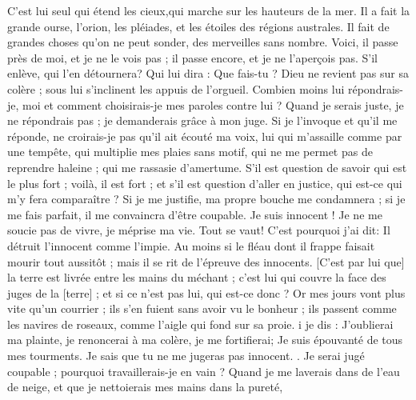 \begin{multicols}{2}
 C'est lui seul qui étend les cieux,qui marche sur les hauteurs de la mer.
Il a fait la grande ourse, l'orion, les pléiades, et les étoiles des régions australes.
Il fait de grandes choses qu'on ne peut sonder, des merveilles sans nombre.
Voici, il passe près de moi, et je ne le vois pas ; il passe encore, et je ne l'aperçois pas.
S'il enlève, qui l'en détournera? Qui lui dira : Que fais-tu ?
Dieu ne revient pas sur sa colère ; sous lui s'inclinent les appuis de l'orgueil.
Combien moins lui répondrais-je, moi et comment choisirais-je mes paroles contre lui ? 
Quand je serais juste, je ne répondrais pas ; je demanderais grâce à mon juge.
Si je l'invoque et qu'il me réponde, ne croirais-je pas qu'il ait écouté ma voix,
lui qui m'assaille comme par une tempête, qui multiplie mes plaies sans motif,
qui ne me permet pas de reprendre haleine ; qui me rassasie d'amertume.
S'il est question de savoir qui est le plus fort ; voilà, il est fort ; et s'il est question d'aller en justice, qui est-ce qui m'y fera comparaître ? 
Si je me justifie, ma propre bouche me condamnera ; si je me fais parfait, il me convaincra d'être coupable.
Je suis innocent ! Je ne me soucie pas de vivre, je méprise ma vie.
Tout se vaut! C'est pourquoi j'ai dit: Il détruit l'innocent comme l'impie. 
Au moins si le fléau dont il frappe faisait mourir tout aussitôt ; mais il se rit de l'épreuve des innocents. 
[C'est par lui que] la terre est livrée entre les mains du méchant ; c'est lui qui couvre la face des juges de la [terre] ; et si ce n'est pas lui, qui est-ce donc ? 
Or mes jours vont plus vite qu'un courrier ; ils s'en fuient sans avoir vu le bonheur ;
ils passent comme les navires de roseaux, comme l'aigle qui fond sur sa proie.
i je dis : J'oublierai ma plainte, je renoncerai à ma colère, je me fortifierai; 
Je suis épouvanté de tous mes tourments. Je sais que tu ne me jugeras pas innocent. .
Je serai jugé coupable ; pourquoi travaillerais-je en vain ?
Quand je me laverais dans de l'eau de neige, et que je nettoierais mes mains dans la pureté, 

\end{multicols}
